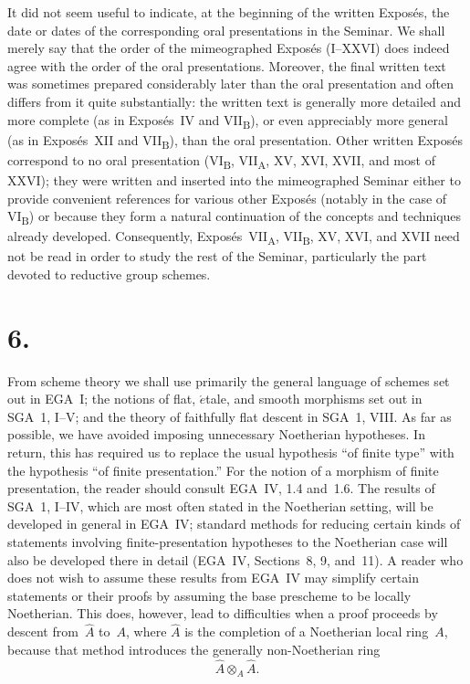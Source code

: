 It did not seem useful to indicate, at the beginning of the written Expos\'es, the
date or dates of the corresponding oral presentations in the Seminar.  We shall
merely say that the order of the mimeographed Expos\'es (I--XXVI) does indeed agree
with the order of the oral presentations.  Moreover, the final written text was
sometimes prepared considerably later than the oral presentation and often differs
from it quite substantially: the written text is generally more detailed and more
complete (as in Expos\'es~IV and VII\textsubscript{B}), or even appreciably more
general (as in Expos\'es~XII and VII\textsubscript{B}), than the oral presentation.
Other written Expos\'es correspond to no oral presentation
(VI\textsubscript{B}, VII\textsubscript{A}, XV, XVI, XVII, and most of XXVI); they
were written and inserted into the mimeographed Seminar either to provide convenient
references for various other Expos\'es (notably in the case of
VI\textsubscript{B}) or because they form a natural continuation of the concepts
and techniques already developed.  Consequently, Expos\'es~VII\textsubscript{A},
VII\textsubscript{B}, XV, XVI, and XVII need not be read in order to study the rest
of the Seminar, particularly the part devoted to reductive group schemes.

\section*{6.}

From scheme theory we shall use primarily the general language of schemes set out in
EGA~I; the notions of flat, \(\acute{e}\)tale, and smooth morphisms set out in
SGA~1, I--V; and the theory of faithfully flat descent in SGA~1, VIII.  As far as
possible, we have avoided imposing unnecessary Noetherian hypotheses.  In return,
this has required us to replace the usual hypothesis ``of finite type'' with the
hypothesis ``of finite presentation.''  For the notion of a morphism of finite
presentation, the reader should consult EGA~IV, 1.4 and~1.6.  The results of
SGA~1, I--IV, which are most often stated in the Noetherian setting, will be
developed in general in EGA~IV; standard methods for reducing certain kinds of statements involving
finite-presentation hypotheses to the Noetherian case will also be developed there
in detail (EGA~IV, Sections~8, 9, and~11).  A reader who does not wish to assume
these results from EGA~IV may simplify certain statements or their proofs by
assuming the base prescheme to be locally Noetherian.  This does, however, lead to
difficulties when a proof proceeds by descent from~$\widehat A$ to~$A$, where
$\widehat A$ is the completion of a Noetherian local ring~$A$, because that method
introduces the generally non-Noetherian ring
\[
  \widehat A\otimes_A\widehat A.
\]

